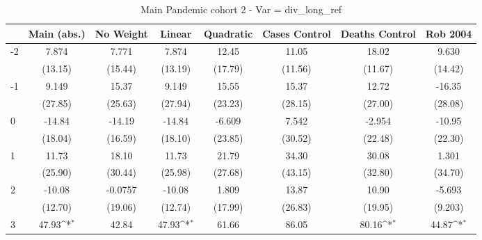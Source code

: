 \documentclass{article}
\begin{document}
{
\def\sym#1{\ifmmode^{#1}\else\(^{#1}\)\fi}
\begin{longtable}{l*{7}{c}}
\caption{Main Pandemic cohort 2 - Var = div\_long\_ref}\\
\hline\hline\endfirsthead\hline\endhead\hline\endfoot\endlastfoot
                &\multicolumn{1}{c}{Main (abs.)}&\multicolumn{1}{c}{No Weight}&\multicolumn{1}{c}{Linear}&\multicolumn{1}{c}{Quadratic}&\multicolumn{1}{c}{Cases Control}&\multicolumn{1}{c}{Deaths Control}&\multicolumn{1}{c}{Rob 2004}\\
\hline
-2              &    7.874         &    7.771         &    7.874         &    12.45         &    11.05         &    18.02         &    9.630         \\
                &  (13.15)         &  (15.44)         &  (13.19)         &  (17.79)         &  (11.56)         &  (11.67)         &  (14.42)         \\
-1              &    9.149         &    15.37         &    9.149         &    15.55         &    15.37         &    12.72         &   -16.35         \\
                &  (27.85)         &  (25.63)         &  (27.94)         &  (23.23)         &  (28.15)         &  (27.00)         &  (28.08)         \\
0               &   -14.84         &   -14.19         &   -14.84         &   -6.609         &    7.542         &   -2.954         &   -10.95         \\
                &  (18.04)         &  (16.59)         &  (18.10)         &  (23.85)         &  (30.52)         &  (22.48)         &  (22.30)         \\
1               &    11.73         &    18.10         &    11.73         &    21.79         &    34.30         &    30.08         &    1.301         \\
                &  (25.90)         &  (30.44)         &  (25.98)         &  (27.68)         &  (43.15)         &  (32.80)         &  (34.70)         \\
2               &   -10.08         &  -0.0757         &   -10.08         &    1.809         &    13.87         &    10.90         &   -5.693         \\
                &  (12.70)         &  (19.06)         &  (12.74)         &  (17.99)         &  (26.83)         &  (19.95)         &  (9.203)         \\
3               &    47.93\sym{*}  &    42.84         &    47.93\sym{*}  &    61.66         &    86.05         &    80.16\sym{*}  &    44.87\sym{*}  \\

\end{longtable}}
\end{document}
